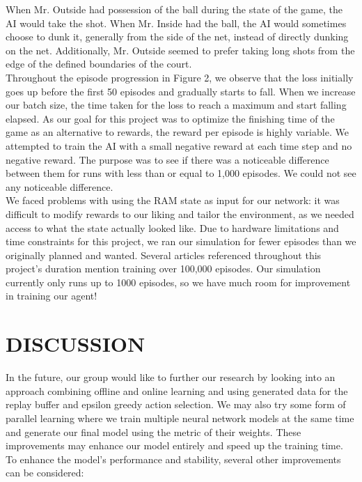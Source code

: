 \documentclass[letterpaper, 10 pt, conference]{ieeeconf}
\begin{document}
When Mr. Outside had possession of the ball during the state of the game, the AI would take the shot. When Mr. Inside had the ball, the AI would sometimes choose to dunk it, generally from the side of the net, instead of directly dunking on the net. Additionally, Mr. Outside seemed to prefer taking long shots from the edge of the defined boundaries of the court. \\

Throughout the episode progression in Figure 2, we observe that the loss initially goes up before the first 50 episodes and gradually starts to fall. When we increase our batch size, the time taken for the loss to reach a maximum and start falling elapsed. As our goal for this project was to optimize the finishing time of the game as an alternative to rewards, the reward per episode is highly variable. We attempted to train the AI with a small negative reward at each time step and no negative reward. The purpose was to see if there was a noticeable difference between them for runs with less than or equal to 1,000 episodes. We could not see any noticeable difference. \\

We faced problems with using the RAM state as input for our network: it was difficult to modify rewards to our liking and tailor the environment, as we needed access to what the state actually looked like. Due to hardware limitations and time constraints for this project, we ran our simulation for fewer episodes than we originally planned and wanted. Several articles referenced throughout this project's duration mention training over 100,000 episodes. Our simulation currently only runs up to 1000 episodes, so we have much room for improvement in training our agent!\\

\section{\textbf{DISCUSSION}}
\vspace{.5cm}
In the future, our group would like to further our research by looking into an approach combining offline and online learning and using generated data for the replay buffer and epsilon greedy action selection. We may also try some form of parallel learning where we train multiple neural network models at the same time and generate our final model using the metric of their weights. These improvements may enhance our model entirely and speed up the training time. To enhance the model's performance and stability, several other improvements can be considered: \\
\end{document}
